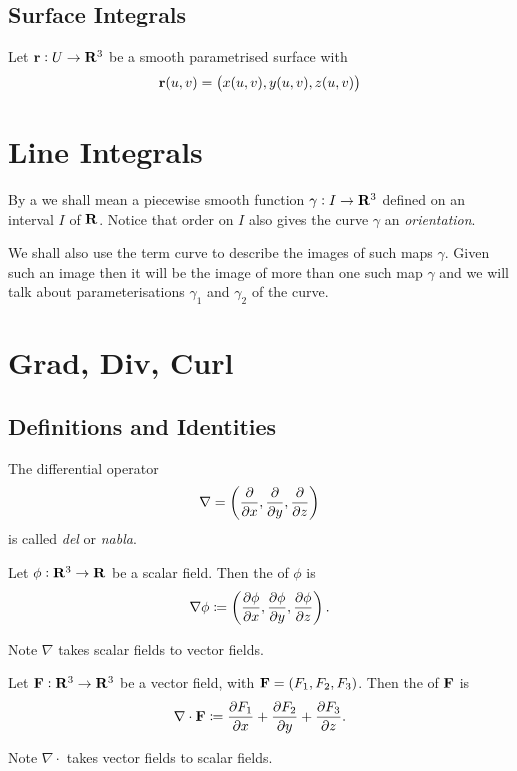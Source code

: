 \subsection{Surface Integrals}
Let $\vb{r}:U\to\mathbf R^3$ be a smooth parametrised surface with
\[\vb{r}(u,v)=\left(x(u,v),y(u,v),z(u,v)\right)\]

\section{Line Integrals}
\begin{definition}
By a  we shall mean a piecewise smooth function $\gamma:I\to\mathbf R^3$ defined on an interval $I$ of $\mathbf R$. Notice that order on $I$ also gives the curve $\gamma$ an \emph{orientation}.
\end{definition}

We shall also use the term curve to describe the images of such maps $\gamma$. Given such an image then it will be the image of more than one such map $\gamma$ and we will talk about parameterisations $\gamma_1$ and $\gamma_2$ of the curve.



\section{Grad, Div, Curl}
\subsection{Definitions and Identities}
The differential operator
\[\nabla=\left(\pdv{}{x},\pdv{}{y},\pdv{}{z}\right)\]
is called \emph{del} or \emph{nabla}.

\begin{definition}[Gradient]
Let $\phi:\mathbf R^3\to\mathbf R$ be a scalar field. Then the  of $\phi$ is
\[\nabla\phi\coloneqq\left(\pdv{\phi}{x},\pdv{\phi}{y},\pdv{\phi}{z}\right).\]
\end{definition}

Note $\nabla$ takes scalar fields to vector fields.

\begin{definition}[Divergence]
Let $\vb{F}:\mathbf R^3\to\mathbf R^3$ be a vector field, with $\vb{F}=(F_1,F_2,F_3)$. Then the  of $\mathbf F$ is
\[\nabla\cdot\vb{F}\coloneqq\pdv{F_1}{x}+\pdv{F_2}{y}+\pdv{F_3}{z}.\]
\end{definition}

Note $\nabla\cdot$ takes vector fields to scalar fields.

